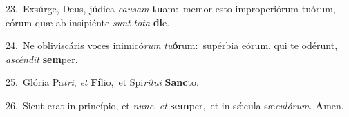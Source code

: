{\numbfont\textcolor{\numbcolor}{23.}}~Exsúrge, Deus, júdica \textit{cau}\-\textit{sam} \textbf{tu}\-am:~\star memor esto improperiórum tuórum, eórum quæ ab insipiénte \textit{sunt} \textit{to}\-\textit{ta} \textbf{di}\-e.\par
{\numbfont\textcolor{\numbcolor}{24.}}~Ne obliviscáris voces inimicó\textit{rum} \textit{tu}\-\textbf{ó}rum:~\star supérbia eórum, qui te odérunt, \textit{a}\-\textit{scén}\textit{dit} \textbf{sem}\-per.\par
{\numbfont\textcolor{\numbcolor}{25.}}~Glória Pa\-\textit{tri}\-, \textit{et} \textbf{Fí}\-lio,~\star et Spi\-\textit{rí}\-\textit{tu}\textit{i} \textbf{Sanc}\-to.\par
{\numbfont\textcolor{\numbcolor}{26.}}~Sicut erat in princípio, et \textit{nunc}\-, \textit{et} \textbf{sem}\-per,~\star et in sǽcula sæ\-\textit{cu}\-\textit{ló}\textit{rum}. \textbf{A}\-men.\par
